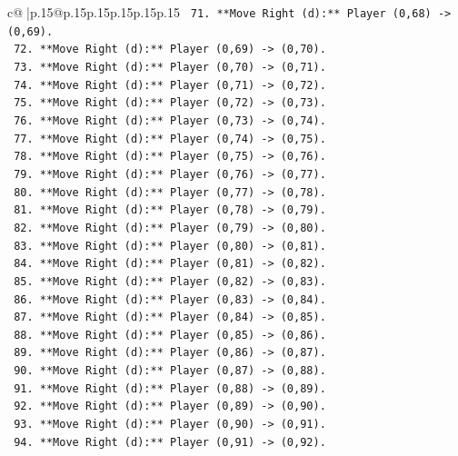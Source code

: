 \documentclass{article}
\begin{document}
{\begin{supertabular}{c@{$\;$}|p{.15\linewidth}@{}p{.15\linewidth}p{.15\linewidth}p{.15\linewidth}p{.15\linewidth}p{.15\linewidth}}
{{{\texttt{        71. **Move Right (d):** Player (0,68) {-}> (0,69).} \\
\texttt{        72. **Move Right (d):** Player (0,69) {-}> (0,70).} \\
\texttt{        73. **Move Right (d):** Player (0,70) {-}> (0,71).} \\
\texttt{        74. **Move Right (d):** Player (0,71) {-}> (0,72).} \\
\texttt{        75. **Move Right (d):** Player (0,72) {-}> (0,73).} \\
\texttt{        76. **Move Right (d):** Player (0,73) {-}> (0,74).} \\
\texttt{        77. **Move Right (d):** Player (0,74) {-}> (0,75).} \\
\texttt{        78. **Move Right (d):** Player (0,75) {-}> (0,76).} \\
\texttt{        79. **Move Right (d):** Player (0,76) {-}> (0,77).} \\
\texttt{        80. **Move Right (d):** Player (0,77) {-}> (0,78).} \\
\texttt{        81. **Move Right (d):** Player (0,78) {-}> (0,79).} \\
\texttt{        82. **Move Right (d):** Player (0,79) {-}> (0,80).} \\
\texttt{        83. **Move Right (d):** Player (0,80) {-}> (0,81).} \\
\texttt{        84. **Move Right (d):** Player (0,81) {-}> (0,82).} \\
\texttt{        85. **Move Right (d):** Player (0,82) {-}> (0,83).} \\
\texttt{        86. **Move Right (d):** Player (0,83) {-}> (0,84).} \\
\texttt{        87. **Move Right (d):** Player (0,84) {-}> (0,85).} \\
\texttt{        88. **Move Right (d):** Player (0,85) {-}> (0,86).} \\
\texttt{        89. **Move Right (d):** Player (0,86) {-}> (0,87).} \\
\texttt{        90. **Move Right (d):** Player (0,87) {-}> (0,88).} \\
\texttt{        91. **Move Right (d):** Player (0,88) {-}> (0,89).} \\
\texttt{        92. **Move Right (d):** Player (0,89) {-}> (0,90).} \\
\texttt{        93. **Move Right (d):** Player (0,90) {-}> (0,91).} \\
\texttt{        94. **Move Right (d):** Player (0,91) {-}> (0,92).} \\
}}}
\end{supertabular}}
\end{document}
